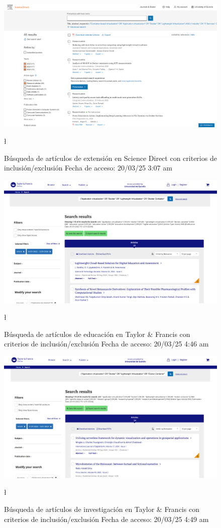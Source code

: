 \FloatBarrier\begin{figure}[H]
    \centering
    \includegraphics[width=\textwidth,keepaspectratio]{apendices/BD/criterios/SD-ind.png}
    \caption{Búsqueda de artículos de extensión en Science Direct con criterios de inclusión/exclusión
    Fecha de acceso: 20/03/25 3:07 am
    }\l
\end{figure}
\FloatBarrier\begin{figure}[H]
    \centering
    \includegraphics[width=\textwidth,keepaspectratio]{apendices/BD/criterios/TF-ed.png}
    \caption{Búsqueda de artículos de educación en Taylor \& Francis con criterios de inclusión/exclusión
    Fecha de acceso: 20/03/25 4:46 am
    }\l
\end{figure}
\FloatBarrier\begin{figure}[H]
    \centering
    \includegraphics[width=\textwidth,keepaspectratio]{apendices/BD/criterios/TF-inv.png}
    \caption{Búsqueda de artículos de investigación en Taylor \& Francis con criterios de inclusión/exclusión
    Fecha de acceso: 20/03/25 4:49 am
    }\l
\end{figure}
